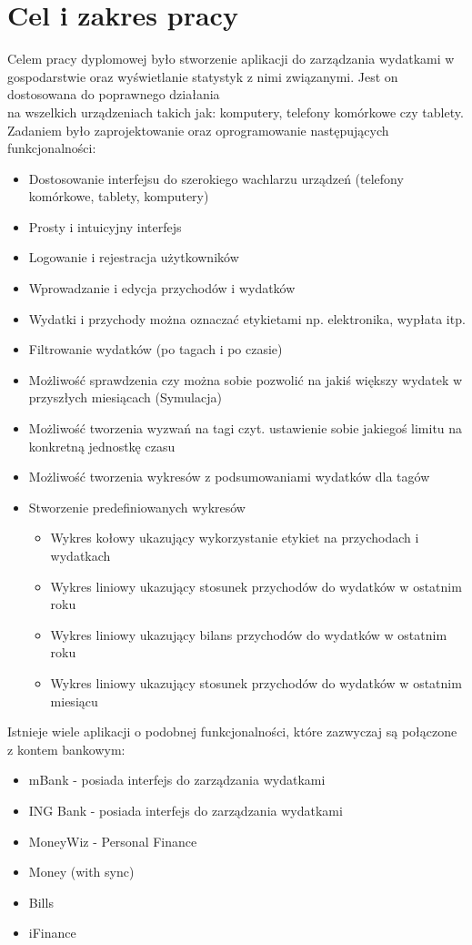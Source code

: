 \documentclass[10pt,titlepage]{article}
\begin{document}
\section{Cel i zakres pracy}
\par Celem pracy dyplomowej było stworzenie aplikacji do zarządzania wydatkami w gospodarstwie oraz wyświetlanie statystyk z nimi związanymi. Jest on dostosowana do poprawnego działania\\ na wszelkich urządzeniach takich jak: komputery, telefony komórkowe czy tablety. Zadaniem było zaprojektowanie oraz oprogramowanie następujących funkcjonalności:
\begin{itemize}
  \item Dostosowanie interfejsu do szerokiego wachlarzu urządzeń (telefony komórkowe, tablety, komputery)
  \item Prosty i intuicyjny interfejs
  \item Logowanie i rejestracja użytkowników
  \item Wprowadzanie i edycja przychodów i wydatków
  \item Wydatki i przychody można oznaczać etykietami np. elektronika, wypłata itp.
  \item Filtrowanie wydatków (po tagach i po czasie)
  \item Możliwość sprawdzenia czy można sobie pozwolić na jakiś większy wydatek w przyszłych miesiącach (Symulacja)
  \item Możliwość tworzenia wyzwań na tagi czyt. ustawienie sobie jakiegoś limitu na konkretną jednostkę czasu
  \item Możliwość tworzenia wykresów z podsumowaniami wydatków dla tagów
  \item Stworzenie predefiniowanych wykresów
    \begin{itemize}
      \item Wykres kołowy ukazujący wykorzystanie etykiet na przychodach i wydatkach
      \item Wykres liniowy ukazujący stosunek przychodów do wydatków w ostatnim roku
      \item Wykres liniowy ukazujący bilans przychodów do wydatków w ostatnim roku
      \item Wykres liniowy ukazujący stosunek przychodów do wydatków w ostatnim miesiącu
    \end{itemize}
\end{itemize}
Istnieje wiele aplikacji o podobnej funkcjonalności, które zazwyczaj są połączone z kontem bankowym:
\begin{itemize}
  \item mBank - posiada interfejs do zarządzania wydatkami
  \item ING Bank - posiada interfejs do zarządzania wydatkami
  \item MoneyWiz - Personal Finance
  \item Money (with sync)
  \item Bills
  \item iFinance
\end{itemize}
\end{document}
